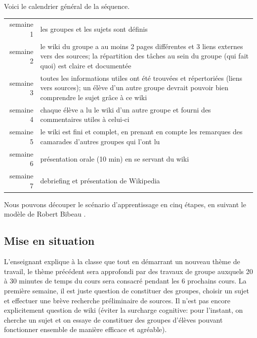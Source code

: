 \documentclass[11pt,bibliography=totoc]{scrartcl}
\begin{document}
Voici le calendrier général de la séquence.
\begin{center}
\begin{tabular}{rp{}}
  semaine 1& les groupes et les sujets sont définis\\
  semaine 2& le wiki du groupe a au moins 2 pages différentes et 3 liens
             externes vers des sources;
             la répartition des tâches au sein du groupe (qui fait quoi) est claire et documentée\\
  semaine 3& toutes les informations utiles ont été trouvées et répertoriées
             (liens vers sources);
             un élève d'un autre groupe devrait pouvoir bien comprendre le sujet grâce à ce wiki\\
  semaine 4& chaque élève a lu le wiki d'un autre groupe et fourni des commentaires utiles à celui-ci\\
  semaine 5& le wiki est fini et complet, en prenant en compte les remarques des
             camarades d'autres groupes qui l'ont lu\\
  semaine 6& présentation orale (10 min) en se servant du wiki \\
  semaine 7& debriefing et présentation de Wikipedia
\end{tabular}  
\end{center}

Nous pouvons découper le scénario d'apprentissage en cinq étapes, en suivant le
modèle de Robert Bibeau \autocite{bibeau}.

\subsection{Mise en situation}
L'enseignant explique à la classe que tout en démarrant un nouveau thème de
travail, le thème précédent sera approfondi par des travaux de groupe auxquels
20 à 30 minutes de temps du cours sera consacré pendant les 6 prochains cours.
La première semaine, il est juste question de constituer des groupes, choisir un
sujet et effectuer une brève recherche préliminaire de sources. Il n'est pas
encore explicitement question de wiki (éviter la surcharge cognitive: pour
l'instant, on cherche un sujet et on essaye de constituer des groupes d'élèves
pouvant fonctionner ensemble de manière efficace et agréable).
\end{document}

